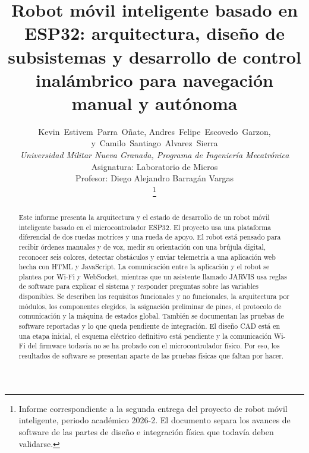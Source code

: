 \documentclass[journal]{IEEEtran}
\begin{document}

\title{Robot móvil inteligente basado en ESP32: arquitectura, diseño de subsistemas y desarrollo de control inalámbrico para navegación manual y autónoma}


\author{
Kevin~Estivem~Parra~Oñate,
Andres~Felipe~Escovedo~Garzon,
y~Camilo~Santiago~Alvarez~Sierra\\
\textit{Universidad Militar Nueva Granada, Programa de Ingeniería Mecatrónica}\\
Asignatura: Laboratorio de Micros\\
Profesor: Diego Alejandro Barragán Vargas\\
\thanks{Informe correspondiente a la segunda entrega del proyecto de robot móvil inteligente, periodo académico 2026-2. El documento separa los avances de software de las partes de diseño e integración física que todavía deben validarse.}
}

\maketitle


\begin{abstract}
Este informe presenta la arquitectura y el estado de desarrollo de un robot móvil inteligente basado en el microcontrolador ESP32. El proyecto usa una plataforma diferencial de dos ruedas motrices y una rueda de apoyo. El robot está pensado para recibir órdenes manuales y de voz, medir su orientación con una brújula digital, reconocer seis colores, detectar obstáculos y enviar telemetría a una aplicación web hecha con HTML y JavaScript. La comunicación entre la aplicación y el robot se plantea por Wi-Fi y WebSocket, mientras que un asistente llamado JARVIS usa reglas de software para explicar el sistema y responder preguntas sobre las variables disponibles. Se describen los requisitos funcionales y no funcionales, la arquitectura por módulos, los componentes elegidos, la asignación preliminar de pines, el protocolo de comunicación y la máquina de estados global. También se documentan las pruebas de software reportadas y lo que queda pendiente de integración. El diseño CAD está en una etapa inicial, el esquema eléctrico definitivo está pendiente y la comunicación Wi-Fi del firmware todavía no se ha probado con el microcontrolador físico. Por eso, los resultados de software se presentan aparte de las pruebas físicas que faltan por hacer.
\end{abstract}
\end{document}

